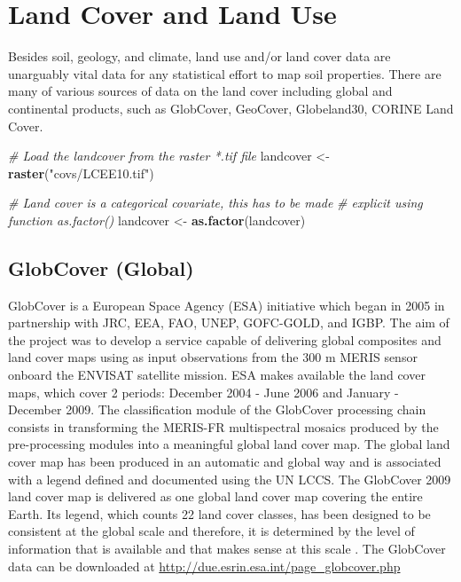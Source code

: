 \documentclass[10pt,b5paper,]{book}
\newenvironment{Shaded}{\begin{snugshade}}{\end{snugshade}}
\newcommand{\CommentTok}[1]{\textcolor[rgb]{0.56,0.35,0.01}{\textit{#1}}}
\newcommand{\KeywordTok}[1]{\textcolor[rgb]{0.13,0.29,0.53}{\textbf{#1}}}
\newcommand{\NormalTok}[1]{#1}
\newcommand{\StringTok}[1]{\textcolor[rgb]{0.31,0.60,0.02}{#1}}
\theoremstyle{definition}
\theoremstyle{definition}
\theoremstyle{definition}
\theoremstyle{remark}
\begin{document}
\hypertarget{land-cover-and-land-use}{%
\section{Land Cover and Land Use}\label{land-cover-and-land-use}}

Besides soil, geology, and climate, land use and/or land cover data are
unarguably vital data for any statistical effort to map soil properties.
There are many of various sources of data on the land cover including
global and continental products, such as GlobCover, GeoCover,
Globeland30, CORINE Land Cover.

\begin{Shaded}
\begin{Highlighting}[]
\CommentTok{# Load the landcover from the raster *.tif file}
\NormalTok{landcover <-}\StringTok{ }\KeywordTok{raster}\NormalTok{(}\StringTok{"covs/LCEE10.tif"}\NormalTok{)}

\CommentTok{# Land cover is a categorical covariate, this has to be made }
\CommentTok{# explicit using function as.factor()}
\NormalTok{landcover <-}\StringTok{ }\KeywordTok{as.factor}\NormalTok{(landcover)}
\end{Highlighting}
\end{Shaded}

\hypertarget{globcover-global}{%
\subsection{GlobCover (Global)}\label{globcover-global}}

GlobCover is a European Space Agency (ESA) initiative which began in
2005 in partnership with JRC, EEA, FAO, UNEP, GOFC-GOLD, and IGBP. The
aim of the project was to develop a service capable of delivering global
composites and land cover maps using as input observations from the 300
m MERIS sensor onboard the ENVISAT satellite mission. ESA makes
available the land cover maps, which cover 2 periods: December 2004 -
June 2006 and January - December 2009. The classification module of the
GlobCover processing chain consists in transforming the MERIS-FR
multispectral mosaics produced by the pre-processing modules into a
meaningful global land cover map. The global land cover map has been
produced in an automatic and global way and is associated with a legend
defined and documented using the UN LCCS. The GlobCover 2009 land cover
map is delivered as one global land cover map covering the entire Earth.
Its legend, which counts 22 land cover classes, has been designed to be
consistent at the global scale and therefore, it is determined by the
level of information that is available and that makes sense at this
scale \citep{bontemps2011globcover}. The GlobCover data can be
downloaded at \url{http://due.esrin.esa.int/page_globcover.php}
\end{document}
